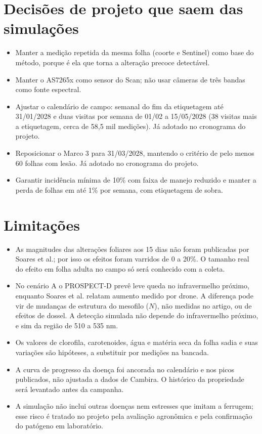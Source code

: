 \documentclass[11pt,a4paper]{article}
\begin{document}
\section{Decisões de projeto que saem das simulações}
\begin{itemize}
\item Manter a medição repetida da mesma folha (coorte e Sentinel) como base do método, porque é ela que torna a alteração precoce detectável.
\item Manter o AS7265x como sensor do Scan; não usar câmeras de três bandas como fonte espectral.
\item Ajustar o calendário de campo: semanal do fim da etiquetagem até 31/01/2028 e duas visitas por semana de 01/02 a 15/05/2028 (38 visitas mais a etiquetagem, cerca de 58,5 mil medições). Já adotado no cronograma do projeto.
\item Reposicionar o Marco 3 para 31/03/2028, mantendo o critério de pelo menos 60 folhas com lesão. Já adotado no cronograma do projeto.
\item Garantir incidência mínima de 10\% com faixa de manejo reduzido e manter a perda de folhas em até 1\% por semana, com etiquetagem de sobra.
\end{itemize}

\section{Limitações}
\begin{itemize}
\item As magnitudes das alterações foliares aos 15 dias não foram publicadas por Soares et al.; por isso os efeitos foram varridos de 0 a 20\%. O tamanho real do efeito em folha adulta no campo só será conhecido com a coleta.
\item No cenário A o PROSPECT-D prevê leve queda no infravermelho próximo, enquanto Soares et al. relatam aumento medido por drone. A diferença pode vir de mudanças de estrutura do mesofilo ($N$), não medidas no artigo, ou de efeitos de dossel. A detecção simulada não depende do infravermelho próximo, e sim da região de 510 a 535 nm.
\item Os valores de clorofila, carotenoides, água e matéria seca da folha sadia e suas variações são hipóteses, a substituir por medições na bancada.
\item A curva de progresso da doença foi ancorada no calendário e nos picos publicados, não ajustada a dados de Cambira. O histórico da propriedade será levantado antes da campanha.
\item A simulação não inclui outras doenças nem estresses que imitam a ferrugem; esse risco é tratado no projeto pela avaliação agronômica e pela confirmação do patógeno em laboratório.
\end{itemize}
\end{document}
